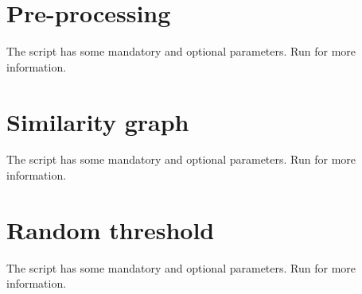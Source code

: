 

\pagebreak
\section{Pre-processing} \label{preprocessing}
The script has some mandatory and optional parameters.
Run  for more information.



\pagebreak
\section{Similarity graph}
The script has some mandatory and optional parameters.
Run  for more information.



\pagebreak
\section{Random threshold}
The script has some mandatory and optional parameters.
Run  for more information.

